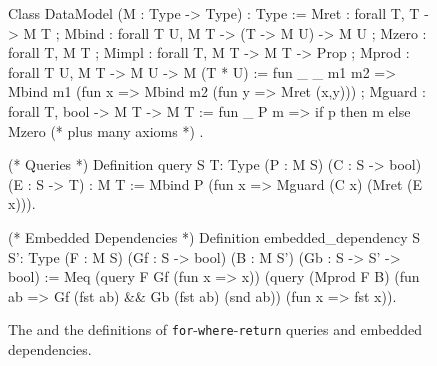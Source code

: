 \documentclass{sigplanconf}
\begin{document}
\begin{figure}[t]
\label{fig:chaseable-functor}
\begin{coq}
Class DataModel (M : Type -> Type) : Type :=
{ Mret  : forall {T}, T -> M T
; Mbind : forall {T U}, M T -> (T -> M U) -> M U
; Mzero : forall {T}, M T
; Mimpl : forall {T}, M T -> M T -> Prop
; Mprod : forall {T U}, M T -> M U -> M (T * U) :=
     fun _ _ m1 m2 => Mbind m1 (fun x => Mbind m2 (fun y => Mret (x,y)))
; Mguard : forall {T}, bool -> M T -> M T :=
     fun _ P m => if p then m else Mzero
 (* plus many axioms *)
}.

(* Queries *)
Definition query {S T: Type}
  (P : M S) (C : S -> bool) (E : S -> T) : M T :=
  Mbind P (fun x => Mguard (C x) (Mret (E x))).

(* Embedded Dependencies *)
Definition embedded_dependency {S S': Type}
  (F : M S) (Gf : S -> bool) (B : M S') (Gb : S -> S' -> bool)
:= Meq (query F Gf (fun x => x))
       (query (Mprod F B)
              (fun ab => Gf (fst ab) && Gb (fst ab) (snd ab))
              (fun x => fst x)).
\end{coq}






\caption{The  and the definitions of {\tt for}-{\tt where}-{\tt return} queries and embedded dependencies.}
\label{fig:chaseable-functor}
\end{figure}
\end{document}
